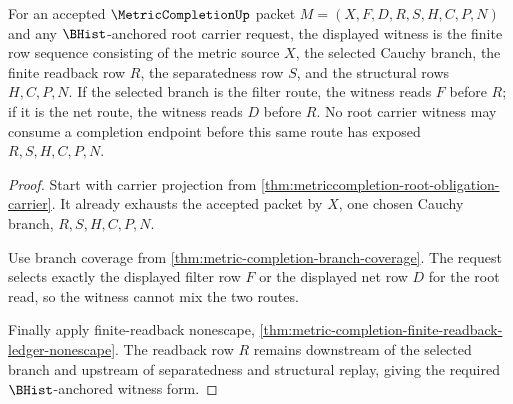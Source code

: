 \begin{theorem}
\label{thm:metriccompletion-root-obligation-carrier-witness}
For an accepted $\MetricCompletionUp$ packet $M=(X,F,D,R,S,H,C,P,N)$ and any $\BHist$-anchored root carrier request, the displayed witness is the finite row sequence consisting of the metric source $X$, the selected Cauchy branch, the finite readback row $R$, the separatedness row $S$, and the structural rows $H,C,P,N$. If the selected branch is the filter route, the witness reads $F$ before $R$; if it is the net route, the witness reads $D$ before $R$. No root carrier witness may consume a completion endpoint before this same route has exposed $R,S,H,C,P,N$.
\end{theorem}
\begin{proof}
Start with carrier projection from \autoref{thm:metriccompletion-root-obligation-carrier}. It already exhausts the accepted packet by $X$, one chosen Cauchy branch, $R,S,H,C,P,N$.

Use branch coverage from \autoref{thm:metric-completion-branch-coverage}. The request selects exactly the displayed filter row $F$ or the displayed net row $D$ for the root read, so the witness cannot mix the two routes.

Finally apply finite-readback nonescape, \autoref{thm:metric-completion-finite-readback-ledger-nonescape}. The readback row $R$ remains downstream of the selected branch and upstream of separatedness and structural replay, giving the required $\BHist$-anchored witness form.
\end{proof}

